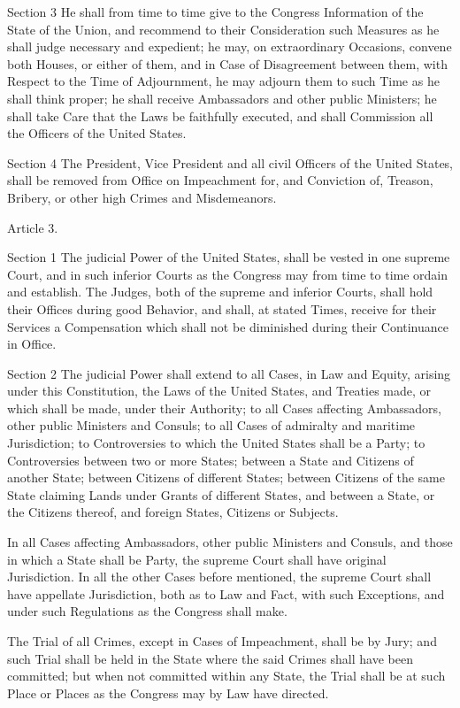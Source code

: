 \documentclass[12pt,a4paper]{article}
\begin{document}
Section 3
He shall from time to time give to the Congress Information of the State of the
Union, and recommend to their Consideration such Measures as he shall judge
necessary and expedient; he may, on extraordinary Occasions, convene both
Houses, or either of them, and in Case of Disagreement between them, with
Respect to the Time of Adjournment, he may adjourn them to such Time as he
shall think proper; he shall receive Ambassadors and other public Ministers; he
shall take Care that the Laws be faithfully executed, and shall Commission all
the Officers of the United States.

Section 4
The President, Vice President and all civil Officers of the United States,
shall be removed from Office on Impeachment for, and Conviction of, Treason,
Bribery, or other high Crimes and Misdemeanors.

Article 3.

Section 1
The judicial Power of the United States, shall be vested in one supreme Court,
and in such inferior Courts as the Congress may from time to time ordain and
establish. The Judges, both of the supreme and inferior Courts, shall hold
their Offices during good Behavior, and shall, at stated Times, receive for
their Services a Compensation which shall not be diminished during their
Continuance in Office.

Section 2
The judicial Power shall extend to all Cases, in Law and Equity, arising under
this Constitution, the Laws of the United States, and Treaties made, or which
shall be made, under their Authority; to all Cases affecting Ambassadors, other
public Ministers and Consuls; to all Cases of admiralty and maritime
Jurisdiction; to Controversies to which the United States shall be a Party; to
Controversies between two or more States; between a State and Citizens of
another State; between Citizens of different States; between Citizens of the
same State claiming Lands under Grants of different States, and between a
State, or the Citizens thereof, and foreign States, Citizens or Subjects.

In all Cases affecting Ambassadors, other public Ministers and Consuls, and
those in which a State shall be Party, the supreme Court shall have original
Jurisdiction. In all the other Cases before mentioned, the supreme Court shall
have appellate Jurisdiction, both as to Law and Fact, with such Exceptions, and
under such Regulations as the Congress shall make.

The Trial of all Crimes, except in Cases of Impeachment, shall be by Jury; and
such Trial shall be held in the State where the said Crimes shall have been
committed; but when not committed within any State, the Trial shall be at such
Place or Places as the Congress may by Law have directed.
\end{document}
